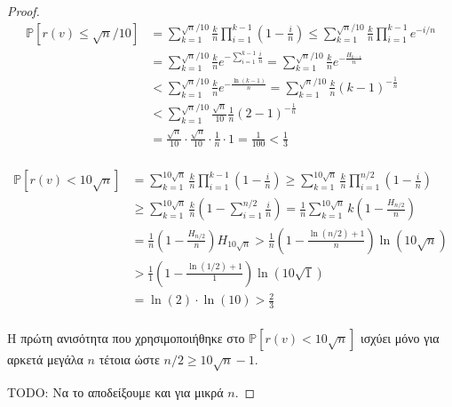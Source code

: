 \documentclass[a4paper, oneside, 11pt]{article}
\theoremstyle{definition}
\newcommand{\pr}{\mathbb{P}}
\begin{document}
\begin{enumerate}
\begin{proof}
      \begin{align*}
         \pr[r(v) \leq \sqrt{n}/10]
            &= \sum_{k=1}^{\sqrt{n}/10} \frac{k}{n} \prod_{i=1}^{k-1} \left(1 -
               \frac{i}{n} \right)
            \leq \sum_{k=1}^{\sqrt{n}/10} \frac{k}{n} \prod_{i=1}^{k-1}
               e^{-i/n}\\
            &= \sum_{k=1}^{\sqrt{n}/10} \frac{k}{n} e^{- \sum_{i=1}^{k-1}
               \frac{i}{n} }
            = \sum_{k=1}^{\sqrt{n}/10} \frac{k}{n} e^{- \frac{H_{k-1}}{n} }\\
            &< \sum_{k=1}^{\sqrt{n}/10} \frac{k}{n} e^{- \frac{\ln(k-1)}{n} }
            = \sum_{k=1}^{\sqrt{n}/10} \frac{k}{n} (k-1)^{-\frac{1}{n}}\\
            &< \sum_{k=1}^{\sqrt{n}/10} \frac{\sqrt{n}}{10} \frac{1}{n}
               (2-1)^{-\frac{1}{n}}\\
            &= \frac{\sqrt{n}}{10} \cdot \frac{\sqrt{n}}{10} \cdot \frac{1}{n}
               \cdot 1 = \frac{1}{100} < \frac{1}{3}\\
      \end{align*}

      \begin{align*}
         \pr[r(v) < 10\sqrt{n}]
            &= \sum_{k=1}^{10\sqrt{n}} \frac{k}{n} \prod_{i=1}^{k-1} \left(1 -
               \frac{i}{n} \right)
            \geq \sum_{k=1}^{10\sqrt{n}} \frac{k}{n} \prod_{i=1}^{n/2} \left(1 -
               \frac{i}{n} \right) \\
            &\geq \sum_{k=1}^{10\sqrt{n}} \frac{k}{n} \left( 1 - \sum_{i=1}^{n/2}
               \frac{i}{n} \right)
            = \frac{1}{n} \sum_{k=1}^{10\sqrt{n}} k \left( 1 -
               \frac{H_{n/2}}{n} \right) \\
            &= \frac{1}{n} \left(1 - \frac{H_{n/2}}{n} \right) H_{10\sqrt{n}}
            > \frac{1}{n} \left( 1 - \frac{\ln(n/2) + 1}{n} \right) \ln(10
               \sqrt{n})\\
            &> \frac{1}{1} \left( 1 - \frac{\ln(1/2) + 1}{1} \right) \ln(10
               \sqrt{1})\\
            &= \ln(2) \cdot \ln(10)  > \frac{2}{3}\\
      \end{align*}

      Η πρώτη ανισότητα που χρησιμοποιήθηκε στο $\pr[r(v) < 10\sqrt{n}]$
      ισχύει μόνο για αρκετά μεγάλα $n$ τέτοια ώστε $n/2 \geq 10\sqrt{n} -1$.

      TODO: Να το αποδείξουμε και για μικρά $n$.


\end{proof}
\end{enumerate}
\end{document}
